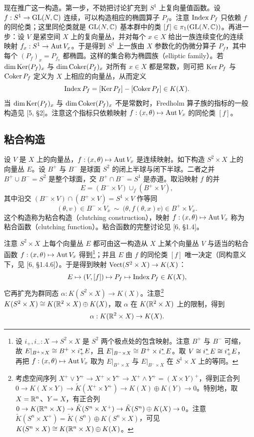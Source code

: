 现在推广这一构造。第一步，不妨把讨论扩充到 $S^1$ 上复向量值函数。设 $f:S^1\to\operatorname{GL}(N,\mathbb{C})$ 连续，可以构造相应的椭圆算子 $P_f$。注意 $\operatorname{Index} P_f$ 只依赖 $f$ 的同伦类；这里同伦类就是 $\operatorname{GL}(N,\mathbb{C})$ 基本群中的类 $[f]\in\pi_1(\operatorname{GL}(N,\mathbb{C}))$。再进一步：设 $V$ 是紧空间 $X$ 上的复向量丛，并对每个 $x\in X$ 给出一族连续变化的连续映射 $f_x:S^1\to\operatorname{Aut} V_x$。于是得到 $S^1$ 上一族由 $X$ 参数化的伪微分算子 $P_f$，其中每个 $(P_f)_x=P_{f_x}$ 都椭圆。这样的集合称为椭圆族（elliptic family）。若 $\dim\operatorname{Ker}(P_f)_x$ 与 $\dim\operatorname{Coker}(P_f)_x$ 对所有 $x\in X$ 都是常数，则可把 $\operatorname{Ker} P_f$ 与 $\operatorname{Coker} P_f$ 定义为 $X$ 上相应的向量丛，从而定义
\[
\operatorname{Index} P_f=[\operatorname{Ker} P_f]-[\operatorname{Coker} P_f]\in K(X).
\]
当 $\dim\operatorname{Ker}(P_f)_x$ 与 $\dim\operatorname{Coker}(P_f)_x$ 不是常数时，Fredholm 算子族的指标的一般构造见 [5, §2]。注意这个指标只依赖映射 $f:(x,\theta)\mapsto\operatorname{Aut} V_x$ 的同伦类 $[f]$。

\subsection{粘合构造}

设 $V$ 是 $X$ 上的向量丛，$f:(x,\theta)\mapsto\operatorname{Aut} V_x$ 是连续映射。如下构造 $S^2\times X$ 上的向量丛 $E$。设 $B^+$ 与 $B^-$ 是球面 $S^2$ 的闭上半球与闭下半球。二者之并 $B^+\cup B^-=S^2$ 是整个球面，交 $B^+\cap B^-=S^1$ 是赤道。取沿映射 $f$ 的并
\[
E=(B^-\times V)\cup_f(B^+\times V),
\]
其中沿交 $(B^-\times V)\cap(B^+\times V)=S^1\times V$ 作等同
\[
(\theta,v)\in B^-\times V_x\ \sim\ \bigl(\theta,f(\theta,x)v\bigr)\in B^+\times V_x.
\]
这个构造称为粘合构造（clutching construction），映射 $f:(x,\theta)\mapsto\operatorname{Aut} V_x$ 称为粘合函数（clutching function）。粘合函数的完整讨论见 [6, §1.4]。

注意 $S^2\times X$ 上每个向量丛 $E$ 都可由这一构造从 $X$ 上某个向量丛 $V$ 与适当的粘合函数 $f:(x,\theta)\mapsto\operatorname{Aut} V_x$ 得到\footnote{设 $i_+,i_-:X\to S^2\times X$ 是 $S^2$ 两个极点处的包含映射。注意 $B^+$ 与 $B^-$ 可缩，故 $E|_{B^+\times X}\cong B^+\times i_+^*E$，且 $E|_{B^-\times X}\cong B^+\times i_-^*E$。取 $V\cong i_-^*E\cong i_+^*E$，再把 $f:(x,\theta)\mapsto\operatorname{Aut} V_x$ 取为 $E|_{B^+\times X}$ 与 $E|_{B^-\times X}$ 在 $S^1\times X$ 上的等同。}；并且 $E$ 由 $f$ 的同伦类 $[f]$ 唯一决定（同构意义下，见 [6, §1.4.6]）。于是得到映射 $\operatorname{Vect}(S^2\times X)\to K(X)$：
\[
E\mapsto (V,[f])\mapsto P_f\mapsto\operatorname{Index} P_f\in K(X),
\]
它再扩充为群同态 $\alpha:K(S^2\times X)\to K(X)$。注意\footnote{考虑空间序列 $X^+\vee Y^+\to X^+\times Y^+\to X^+\wedge Y^+=(X\times Y)^+$，得到正合列 $0\to K(X\times Y)\to\tilde K(X^+\times Y^+)\to K(X)\oplus K(Y)\to0$。特别地，取 $X=\mathbb{R}^n$、$Y=X$，有正合列 $0\to K(\mathbb{R}^n\times X)\to\tilde K(S^n\times X^+)\to\tilde K(S^n)\oplus K(X)\to0$。注意 $\tilde K(S^n\times X^+)=\tilde K(S^n)\oplus K(S^n\times X)$，可见 $K(S^n\times X)\cong K(\mathbb{R}^n\times X)\oplus K(X)$。} $K(S^2\times X)\cong K(\mathbb{R}^2\times X)\oplus K(X)$，取 $\alpha$ 在 $K(\mathbb{R}^2\times X)$ 上的限制，得到
\[
\alpha:K(\mathbb{R}^2\times X)\to K(X).
\]

